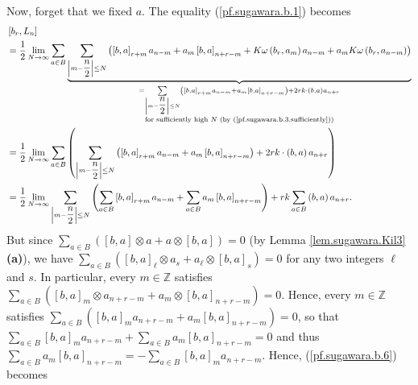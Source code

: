 \documentclass[etingof-lie.tex]{subfiles}
\begin{document}
Now, forget that we fixed $a$. The equality (\ref{pf.sugawara.b.1}) becomes%
\begin{align}
&  \left[  b_{r},L_{n}\right] \nonumber\\
&  =\dfrac{1}{2}\lim\limits_{N\rightarrow\infty}\sum\limits_{a\in
B}\underbrace{\sum\limits_{\left\vert m-\dfrac{n}{2}\right\vert \leq N}\left(
\left[  b,a\right]  _{r+m}a_{n-m}+a_{m}\left[  b,a\right]  _{n+r-m}%
+K\omega\left(  b_{r},a_{m}\right)  a_{n-m}+a_{m}K\omega\left(  b_{r}%
,a_{n-m}\right)  \right)  }_{\substack{=\sum\limits_{\left\vert m-\dfrac{n}%
{2}\right\vert \leq N}\left(  \left[  b,a\right]  _{r+m}a_{n-m}+a_{m}\left[
b,a\right]  _{n+r-m}\right)  +2rk\cdot\left(  b,a\right)  a_{n+r}\\\text{for
sufficiently high }N\text{ (by (\ref{pf.sugawara.b.3.sufficiently}))}%
}}\nonumber\\
&  =\dfrac{1}{2}\lim\limits_{N\rightarrow\infty}\sum\limits_{a\in B}\left(
\sum\limits_{\left\vert m-\dfrac{n}{2}\right\vert \leq N}\left(  \left[
b,a\right]  _{r+m}a_{n-m}+a_{m}\left[  b,a\right]  _{n+r-m}\right)
+2rk\cdot\left(  b,a\right)  a_{n+r}\right) \nonumber\\
&  =\dfrac{1}{2}\lim\limits_{N\rightarrow\infty}\sum\limits_{\left\vert
m-\dfrac{n}{2}\right\vert \leq N}\left(  \sum\limits_{a\in B}\left[
b,a\right]  _{r+m}a_{n-m}+\sum\limits_{a\in B}a_{m}\left[  b,a\right]
_{n+r-m}\right)  +rk\sum\limits_{a\in B}\left(  b,a\right)  a_{n+r}.
\label{pf.sugawara.b.6}%
\end{align}
But since $\sum\limits_{a\in B}\left(  \left[  b,a\right]  \otimes
a+a\otimes\left[  b,a\right]  \right)  =0$ (by Lemma \ref{lem.sugawara.Kil3}
\textbf{(a)}), we have \newline$\sum\limits_{a\in B}\left(  \left[
b,a\right]  _{\ell}\otimes a_{s}+a_{\ell}\otimes\left[  b,a\right]
_{s}\right)  =0$ for any two integers $\ell$ and $s$. In particular, every
$m\in\mathbb{Z}$ satisfies $\sum\limits_{a\in B}\left(  \left[  b,a\right]
_{m}\otimes a_{n+r-m}+a_{m}\otimes\left[  b,a\right]  _{n+r-m}\right)  =0$.
Hence, every $m\in\mathbb{Z}$ satisfies $\sum\limits_{a\in B}\left(  \left[
b,a\right]  _{m}a_{n+r-m}+a_{m}\left[  b,a\right]  _{n+r-m}\right)  =0$, so
that $\sum\limits_{a\in B}\left[  b,a\right]  _{m}a_{n+r-m}+\sum\limits_{a\in
B}a_{m}\left[  b,a\right]  _{n+r-m}=0$ and thus $\sum\limits_{a\in B}%
a_{m}\left[  b,a\right]  _{n+r-m}=-\sum\limits_{a\in B}\left[  b,a\right]
_{m}a_{n+r-m}$. Hence, (\ref{pf.sugawara.b.6}) becomes%
\end{document}
